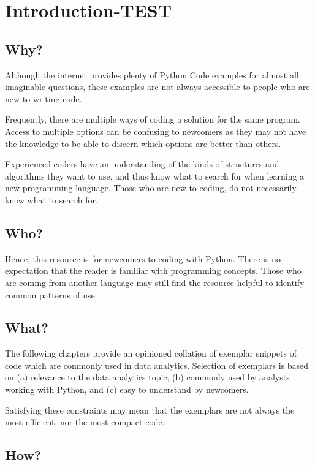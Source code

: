 \chapter{Introduction-TEST}
\label{chapter:introduction}

\section{Why?}

Although the internet provides plenty of Python Code examples for almost all imaginable questions, these examples are not always accessible to people who are new to writing code.

Frequently, there are multiple ways of coding a solution for the same program. Access to multiple options can be confusing to newcomers as they may not have the knowledge to be able to discern which options are better than others.

Experienced coders have an understanding of the kinds of structures and algorithms they want to use, and thus know what to search for when learning a new programming language. Those who are new to coding, do not necessarily know what to search for.

\section{Who?}

Hence, this resource is for newcomers to coding with Python. There is no expectation that the reader is familiar with programming concepts. Those who are coming from another language may still find the resource helpful to identify common patterns of use.

\section{What?}

The following chapters provide an opinioned collation of exemplar snippets of code which are commonly used in data analytics. Selection of exemplars is based on (a) relevance to the data analytics topic, (b) commonly used by analysts working with Python, and (c) easy to understand by newcomers.

Satisfying these constraints may mean that the exemplars are not always the most efficient, nor the most compact code.

\section{How?}

